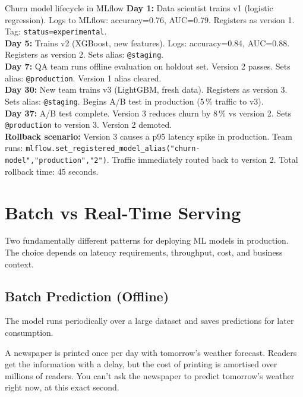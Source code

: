 \documentclass[a4paper,11pt]{article}
\begin{document}
\begin{worked}{Churn model lifecycle in MLflow}
\textbf{Day 1:} Data scientist trains v1 (logistic regression). Logs to MLflow: accuracy=0.76, AUC=0.79. Registers as version 1. Tag: \texttt{status=experimental}. \\[4pt]
\textbf{Day 5:} Trains v2 (XGBoost, new features). Logs: accuracy=0.84, AUC=0.88. Registers as version 2. Sets alias: \texttt{@staging}. \\[4pt]
\textbf{Day 7:} QA team runs offline evaluation on holdout set. Version 2 passes. Sets alias: \texttt{@production}. Version 1 alias cleared. \\[4pt]
\textbf{Day 30:} New team trains v3 (LightGBM, fresh data). Registers as version 3. Sets alias: \texttt{@staging}. Begins A/B test in production (5\,\% traffic to v3). \\[4pt]
\textbf{Day 37:} A/B test complete. Version 3 reduces churn by 8\,\% vs version 2. Sets \texttt{@production} to version 3. Version 2 demoted. \\[4pt]
\textbf{Rollback scenario:} Version 3 causes a p95 latency spike in production. Team runs: \texttt{mlflow.set\_registered\_model\_alias("churn-model","production","2")}. Traffic immediately routed back to version 2. Total rollback time: 45 seconds.
\end{worked}

\section{Batch vs Real-Time Serving}

Two fundamentally different patterns for deploying ML models in production. The choice depends on latency requirements, throughput, cost, and business context.

\subsection{Batch Prediction (Offline)}

The model runs periodically over a large dataset and saves predictions for later consumption.

\begin{everyday}
A newspaper is printed once per day with tomorrow's weather forecast. Readers get the information with a delay, but the cost of printing is amortised over millions of readers. You can't ask the newspaper to predict tomorrow's weather right now, at this exact second.
\end{everyday}
\end{document}
